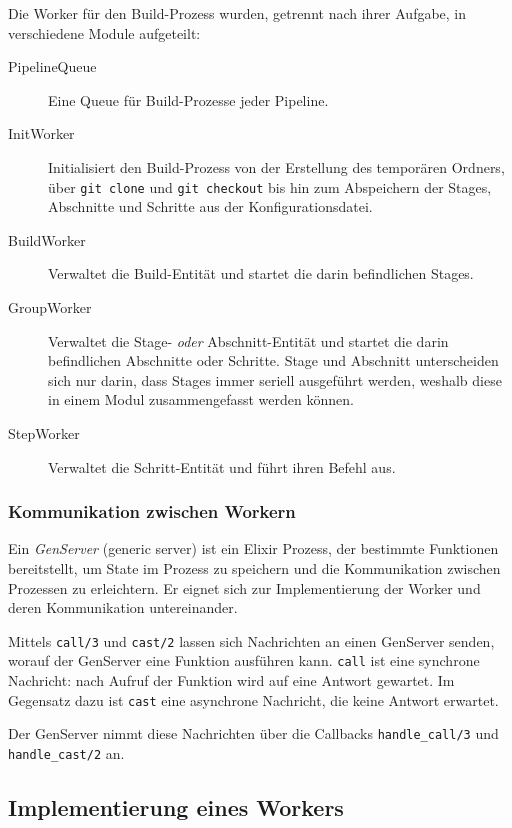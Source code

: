 Die Worker für den Build-Prozess wurden, getrennt nach ihrer Aufgabe, in verschiedene Module aufgeteilt:

\begin{description}
  \item [PipelineQueue] Eine Queue für Build-Prozesse jeder Pipeline.
  \item [InitWorker] Initialisiert den Build-Prozess von der Erstellung des temporären Ordners, über \texttt{git clone} und \texttt{git checkout} bis hin zum Abspeichern der Stages, Abschnitte und Schritte aus der Konfigurationsdatei.
  \item [BuildWorker] Verwaltet die Build-Entität und startet die darin befindlichen Stages.
  \item [GroupWorker] Verwaltet die Stage- \emph{oder} Abschnitt-Entität und startet die darin befindlichen Abschnitte oder Schritte. Stage und Abschnitt unterscheiden sich nur darin, dass Stages immer seriell ausgeführt werden, weshalb diese in einem Modul zusammengefasst werden können.
  \item [StepWorker] Verwaltet die Schritt-Entität und führt ihren Befehl aus.
\end{description}

\subsubsection{Kommunikation zwischen Workern}

Ein \emph{GenServer} (generic server) ist ein Elixir Prozess, der bestimmte Funktionen bereitstellt, um State im Prozess zu speichern und die Kommunikation zwischen Prozessen zu erleichtern. Er eignet sich zur Implementierung der Worker und deren Kommunikation untereinander.

Mittels \texttt{call/3} und \texttt{cast/2} lassen sich Nachrichten an einen GenServer senden, worauf der GenServer eine Funktion ausführen kann. \texttt{call} ist eine synchrone Nachricht: nach Aufruf der Funktion wird auf eine Antwort gewartet. Im Gegensatz dazu ist \texttt{cast} eine asynchrone Nachricht, die keine Antwort erwartet.

Der GenServer nimmt diese Nachrichten über die Callbacks \texttt{handle\_\allowbreak call/3} und \texttt{handle\_\allowbreak cast/2} an.

\subsection{Implementierung eines Workers}
\label{subsec:implementierung-worker}

